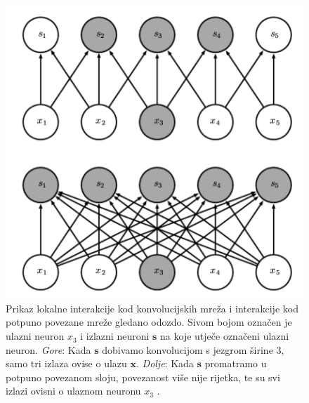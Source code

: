 \documentclass[times, utf8, diplomski]{fer}
\theoremstyle{definition}
\begin{document}
\begin{figure}[!htb]
\centering
\includegraphics[scale=0.25]{lokalna_povezanost_odozdo.png}
\caption{Prikaz lokalne interakcije kod konvolucijskih mreža i interakcije kod potpuno povezane mreže gledano odozdo. Sivom bojom označen je ulazni neuron $x_3$ i izlazni neuroni $\bm{s}$ na koje utječe označeni ulazni neuron. \textit{Gore}: Kada $\bm{s}$ dobivamo konvolucijom s jezgrom širine 3, samo tri izlaza ovise o ulazu $\bm{x}$. \textit{Dolje}: Kada $\bm{s}$ promatramo u potpuno povezanom sloju, povezanost više nije rijetka, te su svi izlazi ovisni o ulaznom neuronu $x_3$ .}
\end{figure}
\newpage
\end{document}
